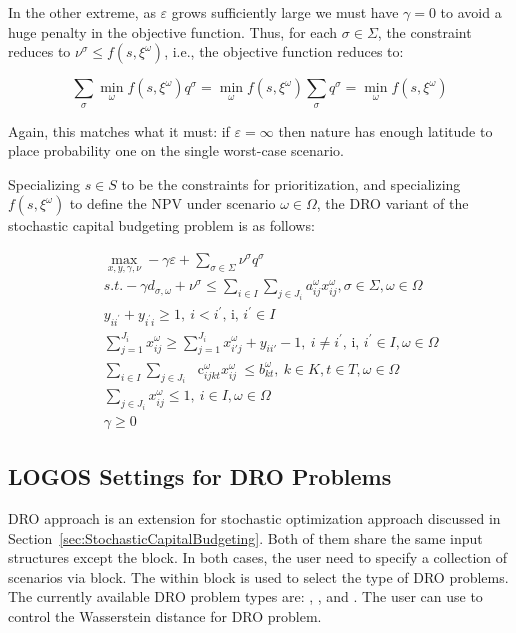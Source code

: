 In the other extreme, as $\varepsilon$ grows sufficiently large we must have $\gamma = 0$
to avoid a huge penalty in the objective function. Thus, for each $\sigma \in \Sigma$,
the constraint reduces to $\nu^\sigma \le f(s, \xi^\omega)$, i.e.,
the objective function reduces to:

\begin{equation}
\sum_\sigma \min_\omega f(s, \xi^\omega) q^\sigma = \min_\omega f(s, \xi^\omega) \sum_\sigma q^\sigma = \min_\omega f(s, \xi^\omega)
\end{equation}

Again, this matches what it must: if $\varepsilon = \infty$ then nature has enough latitude
to place probability one on the single worst-case scenario.

Specializing $s\in S$ to be the constraints for prioritization, and specializing
$f(s,\xi^\omega)$ to define the NPV under scenario $\omega\in \Omega$, the DRO variant of the
stochastic capital budgeting problem is as follows:

\begin{subequations}\label{fullDRO}
\begin{eqnarray}
& & \max_{x, y, \gamma, \nu} -\gamma \varepsilon + \sum_{\sigma\in \Sigma} \nu^\sigma q^\sigma \\
& & s.t. -\gamma d_{\sigma, \omega} + \nu^\sigma \le \sum _{i \in I}^{} \sum _{j \in J_{i}}^{}a_{ij}^{ \omega }x_{ij}^{ \omega }, \sigma \in \Sigma, \omega \in \Omega \\
& & y_{ii^{'}}+y_{i^{'}i} \geq 1,~ i<i^{'}\text{, i, }i^{'} \in I \\
& & \sum_{j=1}^{J_i} x_{ij}^\omega \geq \sum_{j=1}^{J_i} x_{i'j}^\omega + y_{ii'} -1,~ i \neq i^{'}\text{, i, }i^{'} \in I,  \omega  \in  \Omega \\
& & \sum _{i \in I}^{} \sum _{j \in J_{i}}^{}\text{~ c}_{ijkt}^{ \omega }x_{ij}^{ \omega }~  \leq  b_{kt}^{ \omega },~ k \in K, t \in T,  \omega  \in  \Omega \\
& & \sum_{j\in J_i} x_{ij}^{ \omega } \leq 1,~ i \in I, \omega  \in  \Omega \\
& & \gamma \ge 0
\end{eqnarray}
\end{subequations}

\subsection{LOGOS Settings for DRO Problems}
\label{subsec:DROSettings}
DRO approach is an extension for stochastic optimization approach discussed in
Section~\ref{sec:StochasticCapitalBudgeting}. Both of them share the same input
structures except the  block. In both cases, the user need to
specify a collection of scenarios via  block. The
 within  block is used to select the
type of DRO problems. The currently available DRO problem types are:
, , and . The user can
use  to control the Wasserstein distance for DRO problem.

